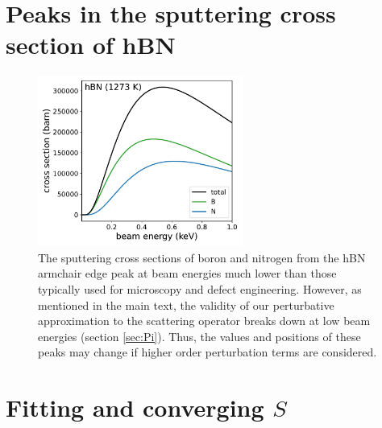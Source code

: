 \documentclass{article}
\begin{document}
\pagebreak
\section{Peaks in the sputtering cross section of hBN}
\label{app:edgePeaks}

\begin{figure}[H]
  \centering
  \includegraphics[width=0.6\textwidth]{figures/edgePeaks.pdf}
  \caption{
    The sputtering cross sections of boron and nitrogen from the hBN armchair
    edge peak at beam energies much lower than those typically used for
    microscopy and defect engineering.
    However, as mentioned in the main text, the validity of our perturbative
    approximation to the scattering operator breaks down at low beam energies
    (section \ref{sec:Pi}).
    Thus, the values and positions of these peaks may change if higher order
    perturbation terms are considered.
  }
  \label{fig:edgePeaks}
\end{figure}

\pagebreak
\section{Fitting and converging $S$}
\label{app:fitting}
\end{document}
